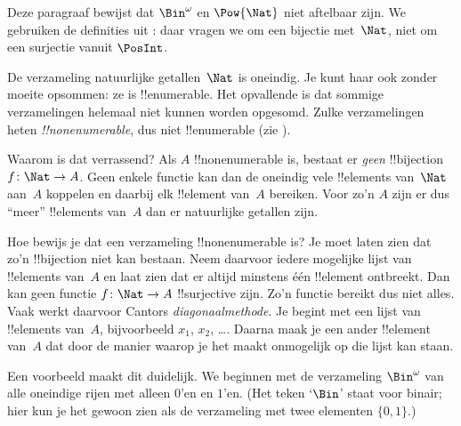 \documentclass[openany]{memoir}
\begin{document}


\begin{editorial}
  Deze paragraaf bewijst dat $\Bin^\omega$ en $\Pow{\Nat}$ niet
  aftelbaar zijn. We gebruiken de definities uit
  : daar vragen we om een bijectie met~$\Nat$, niet
  om een surjectie vanuit $\PosInt$.
\end{editorial}

\begin{explain}
De verzameling natuurlijke getallen~$\Nat$ is oneindig. Je kunt haar
ook zonder moeite opsommen: ze is !!{enumerable}. Het opvallende is dat
sommige verzamelingen helemaal niet kunnen worden opgesomd. Zulke
verzamelingen heten \emph{!!{nonenumerable}}, dus niet !!{enumerable}
(zie ).

Waarom is dat verrassend? Als $A$ !!{nonenumerable} is, bestaat er
\emph{geen} !!{bijection} $f \colon \Nat \to A$. Geen enkele functie
kan dan de oneindig vele !!{element}s van~$\Nat$ aan~$A$ koppelen en
daarbij elk !!{element} van~$A$ bereiken. Voor zo'n $A$ zijn er dus
``meer'' !!{element}s van~$A$ dan er natuurlijke getallen zijn.

Hoe bewijs je dat een verzameling !!{nonenumerable} is? Je moet laten
zien dat zo'n !!{bijection} niet kan bestaan. Neem daarvoor iedere
mogelijke lijst van !!{element}s van~$A$ en laat zien dat er altijd
minstens één !!{element} ontbreekt. Dan kan geen functie
$f\colon \Nat \to A$ !!{surjective} zijn. Zo'n functie bereikt dus
niet alles. Vaak werkt daarvoor Cantors \emph{diagonaalmethode}. Je
begint met een lijst van !!{element}s van~$A$, bijvoorbeeld $x_1$,
$x_2$, \dots. Daarna maak je een ander !!{element} van~$A$ dat door de
manier waarop je het maakt onmogelijk op die lijst kan staan.

Een voorbeeld maakt dit duidelijk. We beginnen met de verzameling
$\Bin^\omega$ van alle oneindige rijen met alleen $0$'en en $1$'en. (Het
teken `$\Bin$' staat voor binair; hier kun je het gewoon zien als de
verzameling met twee elementen
$\{0,1\}$.)
\end{explain}
\end{document}
